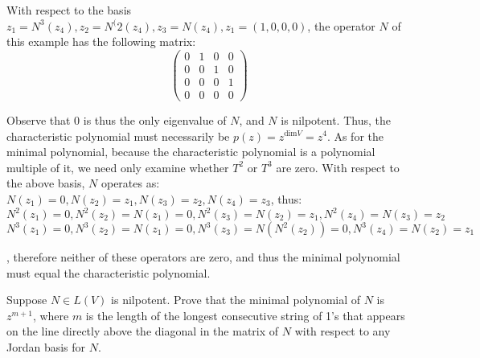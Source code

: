 \begin{solution}

    With respect to the basis $z_1=N^3(z_4), z_2 = N^(2(z_4), z_3 = N(z_4), z_1 = (1, 0, 0, 0)$, the operator $N$ of this example has the following matrix:
    $$\begin{pmatrix} 0 & 1 & 0 & 0 \\ 0 & 0 & 1 & 0 \\ 0 & 0 & 0 & 1 \\ 0 & 0 & 0 & 0
    \end{pmatrix}$$

    Observe that 0 is thus the only eigenvalue of $N$, and $N$ is nilpotent. Thus, the characteristic polynomial must necessarily be $p(z) = z^{\text{dim} V} = z^4$. As for the minimal polynomial, because the characteristic polynomial is a polynomial multiple of it, we need only examine whether $T^2$ or $T^3$ are zero. With respect to the above basis, $N$ operates as: $N(z_1) = 0, N(z_2) = z_1, N(z_3) = z_2, N(z_4) = z_3$, thus:
    $$N^2(z_1) = 0, N^2(z_2) = N(z_1) = 0, N^2(z_3) = N(z_2) = z_1, N^2(z_4) = N(z_3) = z_2$$
    $$N^3(z_1) = 0, N^3(z_2) = N(z_1) = 0, N^3(z_3) = N(N^2(z_2)) = 0, N^3(z_4) = N(z_2) = z_1$$

    , therefore neither of these operators are zero, and thus the minimal polynomial must equal the characteristic polynomial.
    
\end{solution}

\begin{exercise}{3}
    Suppose $N \in L(V)$ is nilpotent. Prove that the minimal polynomial of $N$ is $z^{m+1}$, where $m$ is the length of the longest consecutive string of 1's that appears on the line directly above the diagonal in the matrix of $N$ with respect to any Jordan basis for $N$.
\end{exercise}

